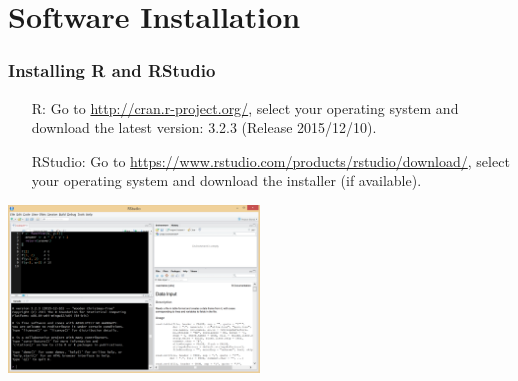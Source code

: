 \section{Software Installation}
\begin{frame}
  \frametitle{Installing R and RStudio}
  		\vspace{-5pt}
        \begin{enumerate}
           \item[R:] Go to \small \url{http://cran.r-project.org/}, select your operating system and download the latest version: 3.2.3 (Release 2015/12/10).
           \item[RStudio:] Go to \small \url{https://www.rstudio.com/products/rstudio/download/}, select your operating system and download the installer (if available).
        \end{enumerate}
%
		\vspace{-5pt}
       \begin{center}
         \includegraphics[width=0.5\textwidth]{images/Rwindow.png}
        \end{center}
\end{frame}


